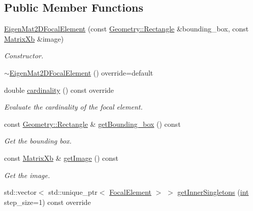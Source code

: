 \subsection*{Public Member Functions}
\begin{DoxyCompactItemize}
\item 
\hyperlink{classEigenFE_1_1EigenMat2DFocalElement_ab1e04c916b081d4ac8f65c071619f2ae}{Eigen\+Mat2\+D\+Focal\+Element} (const \hyperlink{classGeometry_1_1Rectangle}{Geometry\+::\+Rectangle} \&bounding\+\_\+box, const \hyperlink{namespaceEigenFE_a478c1c0c93aef88b798e7c38a9c65d59}{Matrix\+Xb} \&image)
\begin{DoxyCompactList}\small\item\em Constructor. \end{DoxyCompactList}\item 
\hyperlink{classEigenFE_1_1EigenMat2DFocalElement_a8d16fd73bfb48a9cce07e6e8ea5cb83d}{$\sim$\+Eigen\+Mat2\+D\+Focal\+Element} () override=default
\item 
double \hyperlink{classEigenFE_1_1EigenMat2DFocalElement_ac19a1317772f2946bd8956cb084a3a1b}{cardinality} () const override
\begin{DoxyCompactList}\small\item\em Evaluate the cardinality of the focal element. \end{DoxyCompactList}\item 
const \hyperlink{classGeometry_1_1Rectangle}{Geometry\+::\+Rectangle} \& \hyperlink{classEigenFE_1_1EigenMat2DFocalElement_a87b3b927b9b669c4120efb6c271a14d6}{get\+Bounding\+\_\+box} () const 
\begin{DoxyCompactList}\small\item\em Get the bounding box. \end{DoxyCompactList}\item 
const \hyperlink{namespaceEigenFE_a478c1c0c93aef88b798e7c38a9c65d59}{Matrix\+Xb} \& \hyperlink{classEigenFE_1_1EigenMat2DFocalElement_a50caa5018108e7c376c313c8c301165d}{get\+Image} () const 
\begin{DoxyCompactList}\small\item\em Get the image. \end{DoxyCompactList}\item 
std\+::vector$<$ std\+::unique\+\_\+ptr$<$ \hyperlink{classFocalElement}{Focal\+Element} $>$ $>$ \hyperlink{classEigenFE_1_1EigenMat2DFocalElement_a02348604649107935c95106b1fb18a06}{get\+Inner\+Singletons} (\hyperlink{CMakeCache_8txt_a79a3d8790b2588b09777910863574e09}{int} step\+\_\+size=1) const override

\end{DoxyCompactItemize}
